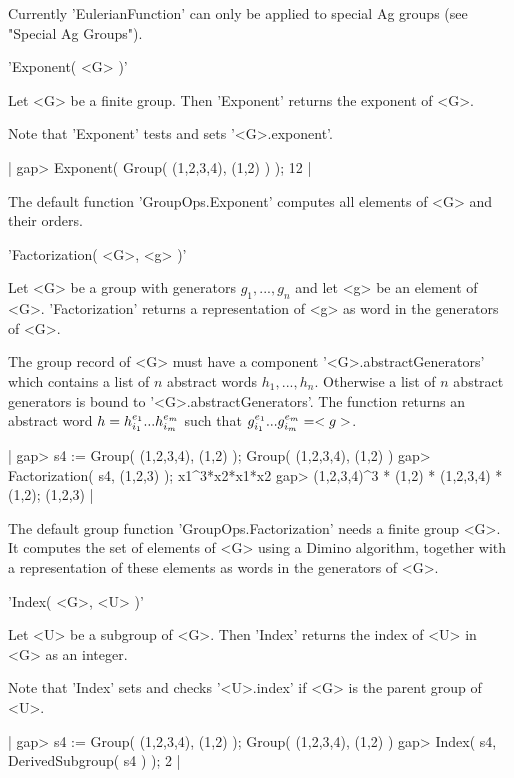 Currently   'EulerianFunction' can only  be applied  to special Ag groups
(see "Special Ag Groups").


'Exponent( <G> )'

Let <G> be a finite group.  Then 'Exponent' returns the exponent of <G>.

Note that 'Exponent' tests and sets '<G>.exponent'.

|    gap> Exponent( Group( (1,2,3,4), (1,2) ) );
    12 |

The default function 'GroupOps.Exponent' computes all elements of <G> and
their orders.


'Factorization( <G>, <g> )'

Let <G>  be a group  with generators $g_1, ...,  g_n$ and let  <g>  be an
element of <G>.  'Factorization' returns a  representation of <g> as word
in the generators of <G>.

The group record  of  <G> must have a component  '<G>.abstractGenerators'
which contains a list of $n$ abstract words $h_1, ..., h_n$.  Otherwise a
list of $n$ abstract generators is bound to '<G>.abstractGenerators'. The
function  returns  an  abstract  word   $h  = h_{i_1}^{e_1}   \*  ...  \*
h_{i_m}^{e_m}$ such that $g_{i_1}^{e_1} \* ... \* g_{i_m}^{e_m} = <g>$.

|    gap> s4 := Group( (1,2,3,4), (1,2) );
    Group( (1,2,3,4), (1,2) )
    gap> Factorization( s4, (1,2,3) );
    x1^3*x2*x1*x2
    gap> (1,2,3,4)^3 * (1,2) * (1,2,3,4) * (1,2);
    (1,2,3) |

The default group function  'GroupOps.Factorization' needs a finite group
<G>.  It computes  the set of  elements of  <G> using a Dimino algorithm,
together  with  a  representation of   these elements as   words   in the
generators of <G>.


'Index( <G>, <U> )'

Let <U> be a subgroup of  <G>.  Then 'Index' returns the  index of <U> in
<G> as an integer.

Note that 'Index' sets and checks '<U>.index' if <G>  is the parent group
of <U>.

|    gap> s4 := Group( (1,2,3,4), (1,2) );
    Group( (1,2,3,4), (1,2) )
    gap> Index( s4, DerivedSubgroup( s4 ) );
    2 |

